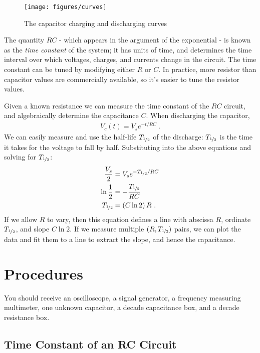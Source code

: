 \documentclass[12pt]{article}
\newcommand{\halflife}{\ensuremath{T_{\nicefrac{1}{2}}}\xspace}
\begin{document}
\begin{figure}
  \centering
  \texttt{[image: figures/curves]}
  \caption{The capacitor charging and discharging curves}
  \label{fig:curves}
\end{figure}
The quantity $RC$ - which appears in the argument of the exponential -
is known as the \textit{time constant} of the system; it has units of
time, and determines the time interval over which voltages, charges,
and currents change in the circuit.  The time constant can be tuned by
modifying either $R$ or $C$.  In practice, more resistor than
capacitor values are commercially available, so it's easier to tune
the resistor values.

Given a known resistance we can measure the time constant of the $RC$
circuit, and algebraically determine the capacitance $C$.  When
discharging the capacitor,
\begin{gather*}
  V_c(t) = V_s e^{-t/RC}\ .
\end{gather*}
We can easily measure and use the half-life \halflife of the
discharge: \halflife is the time it takes for the voltage
to fall by half.  Substituting into the above equations and solving
for \halflife:
\begin{align*}
  \frac{V_s}{2} &= V_s e^{-\halflife/RC}\\
  \ln \frac{1}{2} &= -\frac{\halflife}{RC}\\
  \halflife &= \left(C \ln 2\right) R\ .
\end{align*}
If we allow $R$ to vary, then this equation defines a line with
abscissa $R$, ordinate \halflife, and slope $C \ln 2$.  If we measure
multiple $(R, \halflife)$ pairs, we can plot the data and fit them to
a line to extract the slope, and hence the capacitance.

\section{Procedures}
\label{sec:procedures}

You should receive an oscilloscope, a signal generator, a frequency
measuring multimeter, one unknown capacitor, a decade capacitance box,
and a decade resistance box.

\subsection{Time Constant of an RC Circuit}
\label{sec:timeconst}
\end{document}

